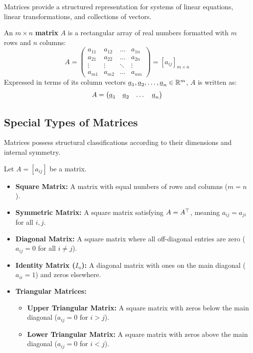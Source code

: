 Matrices provide a structured representation for systems of linear equations, linear transformations, and collections of vectors.

\begin{definition}[Matrix]
    An $m \times n$ \textbf{matrix} $A$ is a rectangular array of real numbers formatted with $m$ rows and $n$ columns:
    \[
        A = \begin{pmatrix}
            a_{11} & a_{12} & \dots & a_{1n} \\
            a_{21} & a_{22} & \dots & a_{2n} \\
            \vdots & \vdots & \ddots & \vdots \\
            a_{m1} & a_{m2} & \dots & a_{mn}
        \end{pmatrix} = [a_{ij}]_{m \times n}
    \]
    Expressed in terms of its column vectors $\underline{a}_1, \underline{a}_2, \dots, \underline{a}_n \in \mathbb{R}^m$, $A$ is written as:
    \[
        A = \begin{pmatrix} \underline{a}_1 & \underline{a}_2 & \dots & \underline{a}_n \end{pmatrix}
    \]
\end{definition}

\subsection{Special Types of Matrices}

Matrices possess structural classifications according to their dimensions and internal symmetry.

\begin{definition}
    Let $A = [a_{ij}]$ be a matrix.
    \begin{itemize}
        \item \textbf{Square Matrix:} A matrix with equal numbers of rows and columns ($m = n$).
        \item \textbf{Symmetric Matrix:} A square matrix satisfying $A = A^{\top}$, meaning $a_{ij} = a_{ji}$ for all $i, j$.
        \item \textbf{Diagonal Matrix:} A square matrix where all off-diagonal entries are zero ($a_{ij} = 0$ for all $i \neq j$).
        \item \textbf{Identity Matrix ($I_n$):} A diagonal matrix with ones on the main diagonal ($a_{ii} = 1$) and zeros elsewhere.
        \item \textbf{Triangular Matrices:}
            \begin{itemize}
                \item \textbf{Upper Triangular Matrix:} A square matrix with zeros below the main diagonal ($a_{ij} = 0$ for $i > j$).
                \item \textbf{Lower Triangular Matrix:} A square matrix with zeros above the main diagonal ($a_{ij} = 0$ for $i < j$).
            \end{itemize}
    \end{itemize}
\end{definition}

